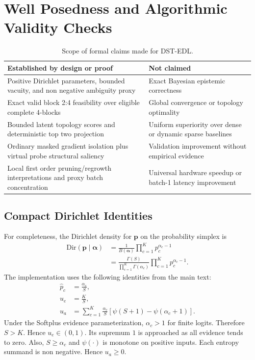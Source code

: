\documentclass[letterpaper]{article}
\newcommand{\Dir}{\text{Dir}}
\begin{document}
\FloatBarrier
\section{Well Posedness and Algorithmic Validity Checks}
\label{app:proofs}

\begin{table}[!t]
\centering
\caption{Scope of formal claims made for DST-EDL.}
\label{tab:guarantees}
\scriptsize
\renewcommand{\arraystretch}{0.98}
\begin{tabular}{@{}p{}p{}@{}}
\toprule
\textbf{Established by design or proof} & \textbf{Not claimed} \\
\midrule
Positive Dirichlet parameters, bounded vacuity, and non negative ambiguity proxy &
Exact Bayesian epistemic correctness \\
Exact valid block 2:4 feasibility over eligible complete 4-blocks &
Global convergence or topology optimality \\
Bounded latent topology scores and deterministic top two projection &
Uniform superiority over dense or dynamic sparse baselines \\
Ordinary masked gradient isolation plus virtual probe structural saliency &
Validation improvement without empirical evidence \\
Local first order pruning/regrowth interpretations and proxy batch concentration &
Universal hardware speedup or batch-1 latency improvement \\
\bottomrule
\end{tabular}
\end{table}

\subsection{Compact Dirichlet Identities}
For completeness, the Dirichlet density for $\bm{p}$ on the probability simplex is
\begin{equation}\label{eq:dirichlet_pdf_app}
\begin{aligned}
    \Dir(\bm p\mid\bm\alpha)
    &=\frac{1}{B(\bm\alpha)}
    \prod_{c=1}^{K}p_c^{\alpha_c-1}\\
    &=\frac{\Gamma(S)}
    {\prod_{c=1}^{K}\Gamma(\alpha_c)}
    \prod_{c=1}^{K}p_c^{\alpha_c-1}.
\end{aligned}
\end{equation}
The implementation uses the following identities from the main text:
\begin{equation}
\begin{aligned}
    \hat p_c&=\frac{\alpha_c}{S},\\
    u_e&=\frac{K}{S},\\
    u_a&=\sum_{c=1}^{K}\frac{\alpha_c}{S}
    \left[\psi(S+1)-\psi(\alpha_c+1)\right].
\end{aligned}
\end{equation}
Under the Softplus evidence parameterization, $\alpha_c>1$ for finite logits. Therefore $S>K$. Hence $u_e\in(0,1)$. Its supremum $1$ is approached as all evidence tends to zero. Also, $S\ge \alpha_c$ and $\psi(\cdot)$ is monotone on positive inputs. Each entropy summand is non negative. Hence $u_a\ge0$.
\end{document}
